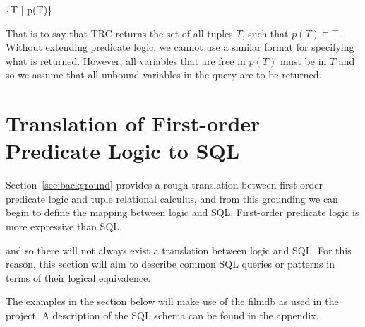 \documentclass[a4paper, 11pt]{article}
\begin{document}
      \{T | p(T)\}

      That is to say that TRC returns the set of all tuples $T$, such that 
      $p(T) \models \top$. Without extending predicate logic, we cannot use 
      a similar format for specifying what is returned. However, all 
      variables that are free in $p(T)$ must be in $T$ and so we assume 
      that all unbound variables in the query are to be returned.

  \section{Translation of First-order Predicate Logic to SQL}

    Section~\ref{sec:background} provides a rough translation between
    first-order predicate logic and tuple relational calculus, and from this
    grounding we can begin to define the mapping between logic and SQL.
    First-order predicate logic is more expressive than SQL,

    and so there will not always exist a
    translation between logic and SQL. For this reason, this section will aim
    to describe common SQL queries or patterns in terms of their logical
    equivalence.

    The examples in the section below will make use of the filmdb as used in
    the project. A description of the SQL schema can be found in the appendix.
\end{document}
